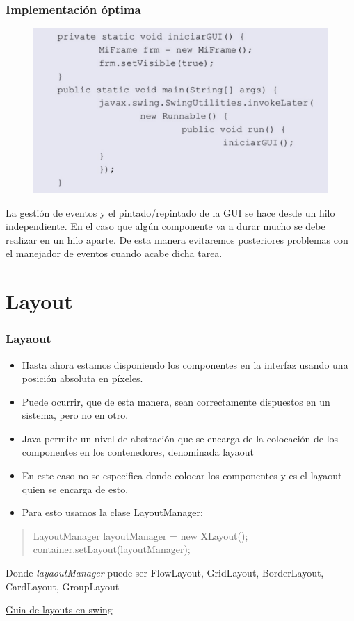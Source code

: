 \documentclass{beamer}
\begin{document}
\begin{frame}
\frametitle{Implementación óptima}
\begin{figure}
\includegraphics[scale=0.5]{imagenes/invokelater.png}
\end{figure}
La gestión de eventos y el pintado/repintado de la GUI se hace desde un hilo independiente. En el caso que algún componente va a durar mucho se debe realizar en un hilo aparte. De esta manera evitaremos posteriores problemas con el manejador de eventos cuando acabe dicha tarea.
\end{frame}

\section{Layout}
\begin{frame}[fragile]
    \frametitle{Layaout}
  \begin{itemize}[<+->]
  \item Hasta ahora estamos disponiendo los componentes en la interfaz usando una posición absoluta en píxeles.
  \item Puede ocurrir, que de esta manera, sean correctamente dispuestos en un sistema, pero no en otro.
  \item Java permite un nivel de abstración que se encarga de la colocación de los componentes en los contenedores, denominada \alert{layaout}
  \item En este caso no se especifica donde colocar los componentes y es el layaout quien se encarga de esto.
  \item Para esto usamos la clase \alert{LayoutManager}:
    \end{itemize}
    \pause
    \begin{quote}
    LayoutManager layoutManager = new XLayout();\\
container.setLayout(layoutManager);
    \end{quote}
    \pause
    Donde \emph{layaoutManager} puede ser \alert{FlowLayout, GridLayout, BorderLayout, CardLayout, GroupLayout}\\
  \begin{center}
  {\color{blue}\href{https://docs.oracle.com/javase/tutorial/uiswing/layout/visual.html}{Guia de layouts en swing}}
  \end{center}
    
\end{frame}
\end{document}
